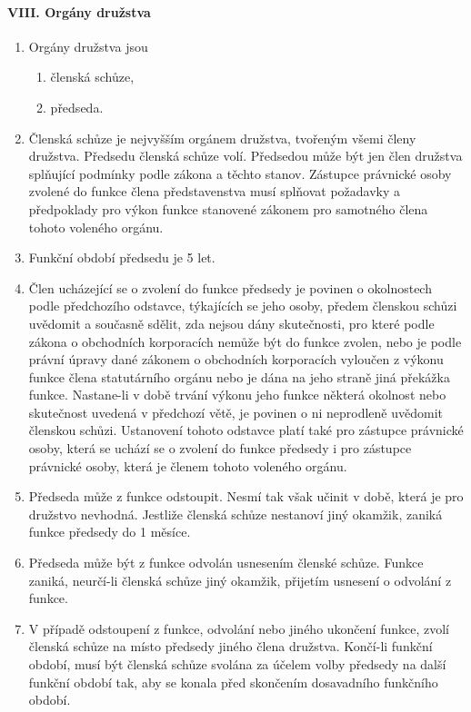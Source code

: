 \paragraph{VIII. Orgány družstva}
\begin{enumerate}
    \item Orgány družstva jsou
    \begin{enumerate}[label=\alph*.]
        \item členská schůze,
        \item předseda.
    \end{enumerate}
    \item Členská schůze je nejvyšším orgánem družstva, tvořeným všemi členy družstva. Předsedu členská schůze volí. Předsedou může být jen člen družstva splňující podmínky podle zákona a těchto stanov. Zástupce právnické osoby zvolené do funkce člena představenstva musí splňovat požadavky a předpoklady pro výkon funkce stanovené zákonem pro samotného člena tohoto voleného orgánu.
    \item Funkční období předsedu je 5 let.
    \item Člen ucházející se o zvolení do funkce předsedy je povinen o okolnostech podle předchozího odstavce, týkajících se jeho osoby, předem členskou schůzi uvědomit a současně sdělit, zda nejsou dány skutečnosti, pro které podle zákona o obchodních korporacích nemůže být do funkce zvolen, nebo je podle právní úpravy dané zákonem o obchodních korporacích vyloučen z výkonu funkce člena statutárního orgánu nebo je dána na jeho straně jiná překážka funkce. Nastane-li v době trvání výkonu jeho funkce některá okolnost nebo skutečnost uvedená v předchozí větě, je povinen o ni neprodleně uvědomit členskou schůzi. Ustanovení tohoto odstavce platí také pro zástupce právnické osoby, která se uchází se o zvolení do funkce předsedy i pro zástupce právnické osoby, která je členem tohoto voleného orgánu.
    \item Předseda může z funkce odstoupit. Nesmí tak však učinit v době, která je pro družstvo nevhodná. Jestliže členská schůze nestanoví jiný okamžik, zaniká funkce předsedy do 1 měsíce.
    \item Předseda může být z funkce odvolán usnesením členské schůze. Funkce zaniká, neurčí-li členská schůze jiný okamžik, přijetím usnesení o odvolání z funkce.
    \item V případě odstoupení z funkce, odvolání nebo jiného ukončení funkce, zvolí členská schůze na místo předsedy jiného člena družstva. Končí-li funkční období, musí být členská schůze svolána za účelem volby předsedy na další funkční období tak, aby se konala před skončením dosavadního funkčního období.
\end{enumerate}

